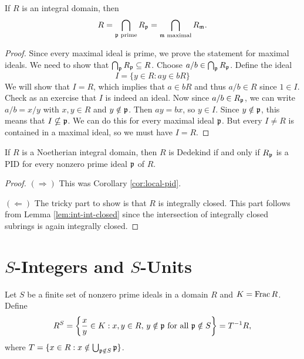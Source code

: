\begin{lemma}\label{lem:int-int-closed}
  If $R$ is an integral domain, then
  \[
    R = \bigcap_{\mathfrak{p} \text{ prime}} R_{\mathfrak{p}}
    = \bigcap_{\mathfrak{m} \text{ maximal}} R_{\mathfrak{m}}.
  \]
\end{lemma}

\begin{proof}
  Since every maximal ideal is prime, we prove
  the statement for maximal ideals. We need to show that
  $\bigcap_{\mathfrak{p}} R_{\mathfrak{p}} \subseteq R$. Choose
  $a / b \in \bigcap_{\mathfrak{p}} R_{\mathfrak{p}}$. Define the ideal
  \[
    I = \{y \in R : ay \in bR\}
  \]
  We will show that $I = R$, which implies that
  $a \in b R$ and thus $a / b \in R$ since
  $1 \in I$. Check as an exercise that $I$ is indeed
  an ideal. Now since $a / b \in R_{\mathfrak{p}}$, we can
  write $a / b = x / y$ with $x, y \in R$ and
  $y \notin \mathfrak{p}$. Then $ay = bx$, so $y \in I$.
  Since $y \notin \mathfrak{p}$, this means that $I \nsubseteq \mathfrak{p}$.
  We can do this for every maximal ideal $\mathfrak{p}$. But every
  $I \ne R$ is contained in a maximal ideal, so 
  we must have $I = R$.
\end{proof}

\begin{theorem}
  If $R$ is a Noetherian integral domain, then $R$ is
  Dedekind if and only if $R_{\mathfrak{p}}$ is a PID for
  every nonzero prime ideal $\mathfrak{p}$ of $R$.
\end{theorem}

\begin{proof}
  $(\Rightarrow)$ This was Corollary \ref{cor:local-pid}.

  $(\Leftarrow)$ The tricky part to
  show is that $R$ is integrally closed. This part
  follows from Lemma \ref{lem:int-int-closed} since the
  intersection
  of integrally closed subrings is again
  integrally closed.
\end{proof}

\section{\texorpdfstring{$S$}{S}-Integers and \texorpdfstring{$S$}{S}-Units}

\begin{definition}
  Let $S$ be a finite set of nonzero prime ideals in
  a domain $R$ and $K = \operatorname{Frac} R$. Define
  \[
    R^S = \left\{
      \frac{x}{y} \in K : x, y \in R,\, y \notin \mathfrak{p} \text{ for all } \mathfrak{p} \notin S
    \right\}
    = T^{-1} R,
  \]
  where $T = \{x \in R : x \notin \bigcup_{\mathfrak{p} \notin S} \mathfrak{p}\}$.
\end{definition}

